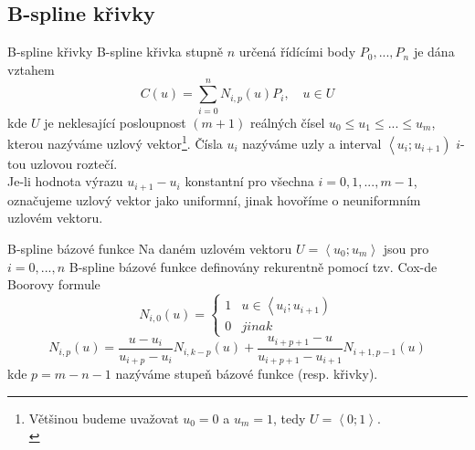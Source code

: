 \documentclass[hyperref={unicode}]{beamer}
\begin{document}

\subsection{B-spline křivky}
\begin{frame}{B-spline křivky}
B-spline křivka stupně $n$ určená řídícími body $P_0,...,P_n$ je dána vztahem
$$C\left(u\right)=\sum _{i=0}^{n}{N}_{i,p}\left(u\right){P}_{i},\quad u\in U$$
kde $U$ je neklesající posloupnost $\left(m+1\right)$ reálných čísel $u_0\leq u_1\leq ... \leq u_m$, kterou nazýváme uzlový vektor\footnote{Většinou budeme uvažovat $u_0=0$ a $u_m=1$, tedy $U=\left\langle 0;1\right\rangle$.\\}. Čísla $u_i$ nazýváme uzly a interval $\left\langle u_i;u_{i+1}\right)$ $i$-tou uzlovou roztečí.
\\\medskip
Je-li hodnota výrazu $u_{i+1}-u_i$ konstantní pro všechna $i=0,1,...,m-1$, označujeme uzlový vektor jako uniformní, jinak hovoříme o neuniformním uzlovém vektoru.
\end{frame}

\begin{frame}{B-spline bázové funkce}
Na daném uzlovém vektoru $U=\left\langle u_0;u_m\right\rangle$ jsou pro $i=0,...,n$ B-spline bázové funkce definovány rekurentně pomocí tzv. Cox-de Boorovy formule
$$N_{i,0}(u)=\left\{\begin{matrix}1 & u\in\left\langle u_i;u_{i+1} \right)
\\ 
0 & jinak
\end{matrix}\right.$$
$$N_{i,p}(u)=\frac{u-u_i}{u_{i+p}-u_i}N_{i,k-p}(u)+\frac{u_{i+p+1}-u}{u_{i+p+1}-u_{i+1}}N_{i+1,p-1}(u)$$
kde $p=m-n-1$ nazýváme stupeň bázové funkce (resp. křivky).
\end{frame}
\end{document}
